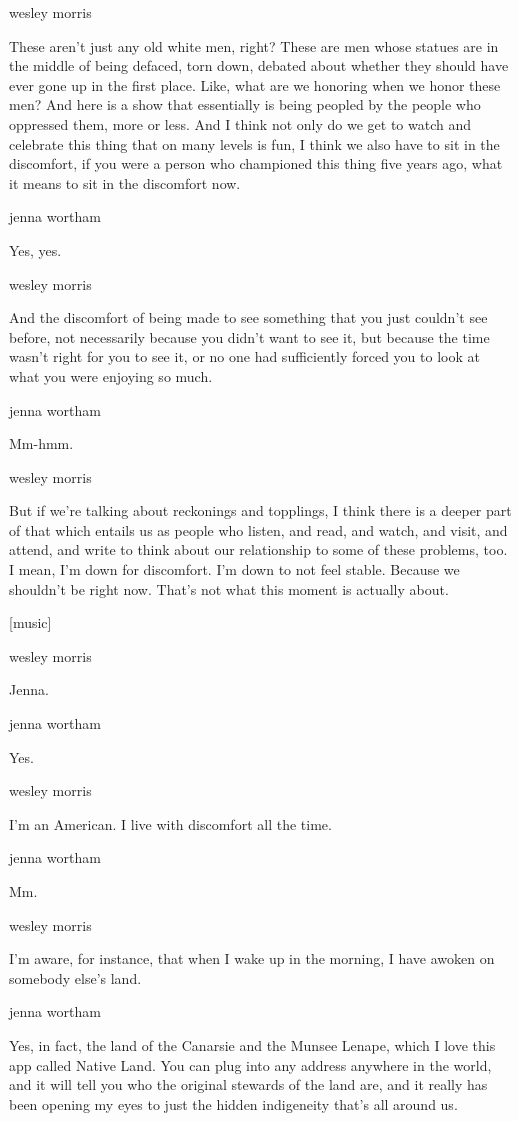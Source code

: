 wesley morris

These aren't just any old white men, right? These are men whose statues
are in the middle of being defaced, torn down, debated about whether
they should have ever gone up in the first place. Like, what are we
honoring when we honor these men? And here is a show that essentially is
being peopled by the people who oppressed them, more or less. And I
think not only do we get to watch and celebrate this thing that on many
levels is fun, I think we also have to sit in the discomfort, if you
were a person who championed this thing five years ago, what it means to
sit in the discomfort now.

jenna wortham

Yes, yes.

wesley morris

And the discomfort of being made to see something that you just couldn't
see before, not necessarily because you didn't want to see it, but
because the time wasn't right for you to see it, or no one had
sufficiently forced you to look at what you were enjoying so much.

jenna wortham

Mm-hmm.

wesley morris

But if we're talking about reckonings and topplings, I think there is a
deeper part of that which entails us as people who listen, and read, and
watch, and visit, and attend, and write to think about our relationship
to some of these problems, too. I mean, I'm down for discomfort. I'm
down to not feel stable. Because we shouldn't be right now. That's not
what this moment is actually about.

{[}music{]}

wesley morris

Jenna.

jenna wortham

Yes.

wesley morris

I'm an American. I live with discomfort all the time.

jenna wortham

Mm.

wesley morris

I'm aware, for instance, that when I wake up in the morning, I have
awoken on somebody else's land.

jenna wortham

Yes, in fact, the land of the Canarsie and the Munsee Lenape, which I
love this app called Native Land. You can plug into any address anywhere
in the world, and it will tell you who the original stewards of the land
are, and it really has been opening my eyes to just the hidden
indigeneity that's all around us.

